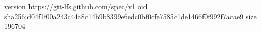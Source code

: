 version https://git-lfs.github.com/spec/v1
oid sha256:d04f1f00a243c44a8c14b9b8399e6edc0bf0cfe7585c1de1466f0f992f7acae9
size 196704
